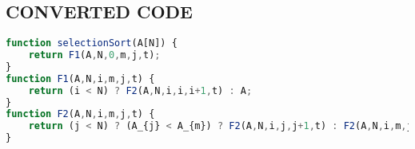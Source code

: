 \documentclass{article}
\begin{document}
\subsection{CONVERTED CODE}
\begin{lstlisting}[language=JavaScript]
function selectionSort(A[N]) {
    return F1(A,N,0,m,j,t);
}
function F1(A,N,i,m,j,t) {
    return (i < N) ? F2(A,N,i,i,i+1,t) : A;
}
function F2(A,N,i,m,j,t) {
    return (j < N) ? (A_{j} < A_{m}) ? F2(A,N,i,j,j+1,t) : F2(A,N,i,m,j+1,t) : (i != m) ? F1( | |A + \delta_{N}(i)(A_{m} -  |A + \delta_{N}(i)(A_{m} - A_{i})| _{i})|  + \delta_{N}(m)(A_{i} - A_{m})| ,N,i+1,m,j,A_{i}) : F1(A,N,i+1,m,j,t);
}

\end{lstlisting}
\end{document}
